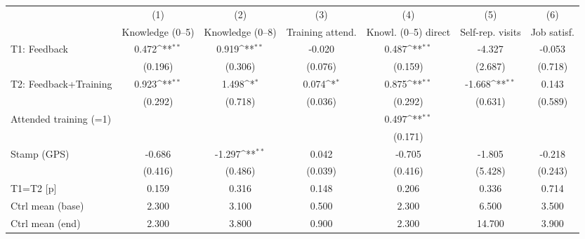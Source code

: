 {
\def\sym#1{\ifmmode^{#1}\else\(^{#1}\)\fi}
\begin{tabular}{l*{6}{c}}
\toprule
                    &\multicolumn{1}{c}{(1)}&\multicolumn{1}{c}{(2)}&\multicolumn{1}{c}{(3)}&\multicolumn{1}{c}{(4)}&\multicolumn{1}{c}{(5)}&\multicolumn{1}{c}{(6)}\\
                    &\multicolumn{1}{c}{Knowledge (0--5)}&\multicolumn{1}{c}{Knowledge (0--8)}&\multicolumn{1}{c}{Training attend.}&\multicolumn{1}{c}{Knowl. (0--5) direct}&\multicolumn{1}{c}{Self-rep. visits}&\multicolumn{1}{c}{Job satisf.}\\
\midrule
T1: Feedback        &       0.472\sym{**} &       0.919\sym{**} &      -0.020         &       0.487\sym{**} &      -4.327         &      -0.053         \\
                    &     (0.196)         &     (0.306)         &     (0.076)         &     (0.159)         &     (2.687)         &     (0.718)         \\
T2: Feedback+Training&       0.923\sym{**} &       1.498\sym{*}  &       0.074\sym{*}  &       0.875\sym{**} &      -1.668\sym{**} &       0.143         \\
                    &     (0.292)         &     (0.718)         &     (0.036)         &     (0.292)         &     (0.631)         &     (0.589)         \\
Attended training (=1)&                     &                     &                     &       0.497\sym{**} &                     &                     \\
                    &                     &                     &                     &     (0.171)         &                     &                     \\
Stamp (GPS)         &      -0.686         &      -1.297\sym{**} &       0.042         &      -0.705         &      -1.805         &      -0.218         \\
                    &     (0.416)         &     (0.486)         &     (0.039)         &     (0.416)         &     (5.428)         &     (0.243)         \\
\midrule
T1=T2 [p]           &       0.159         &       0.316         &       0.148         &       0.206         &       0.336         &       0.714         \\
Ctrl mean (base)    &       2.300         &       3.100         &       0.500         &       2.300         &       6.500         &       3.500         \\
Ctrl mean (end)     &       2.300         &       3.800         &       0.900         &       2.300         &      14.700         &       3.900         \\

\end{tabular}}
